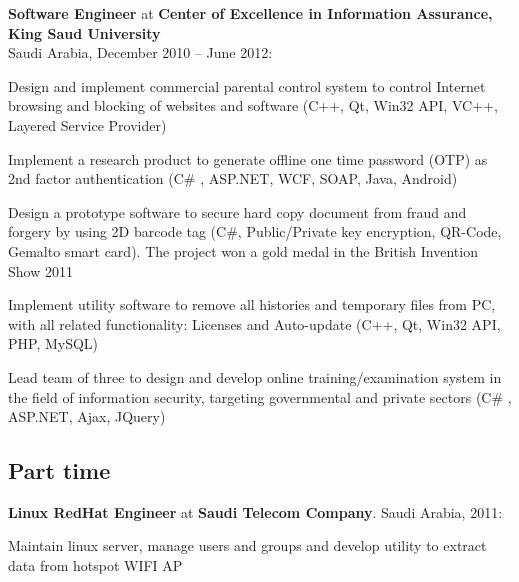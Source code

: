 \documentclass[letterpaper]{article}
\renewenvironment{itemize}{
  \begin{list}{}{
    \setlength{\leftmargin}{1.5em}
  }
}{
  \end{list}
}
\begin{document}
\begin{itemize}
\item \textbf{Software Engineer} at \textbf{Center of Excellence in Information Assurance, King Saud University} \\ Saudi Arabia, December 2010 -- June 2012:
\begin{itemize}
\item Design and implement commercial parental control system to control Internet browsing and blocking of websites and software (C++, Qt, Win32 API, VC++, Layered Service Provider)
\item Implement a research product to generate offline one time password (OTP) as 2nd factor authentication (C\# , ASP.NET, WCF, SOAP, Java, Android)
\item Design a prototype software to secure hard copy document from fraud and forgery by using 2D barcode tag (C\#, Public/Private key encryption, QR-Code, Gemalto smart card). The project won a gold medal in the British Invention Show 2011 %
\item Implement utility software to remove all histories and temporary files from PC, with all related functionality: Licenses and Auto-update (C++, Qt, Win32 API, PHP, MySQL)
\item Lead team of three to design and develop online training/examination system in the field of information security, targeting governmental and private sectors (C\# , ASP.NET, Ajax, JQuery)
\end{itemize}

\end{itemize}

\subsection*{Part time}
\begin{itemize}

\item \textbf{Linux RedHat Engineer} at \textbf{Saudi Telecom Company}. Saudi Arabia, 2011:
\begin{itemize}
\item Maintain linux server, manage users and groups and develop utility to extract data from hotspot WIFI AP
\end{itemize}

\end{itemize}
\end{document}
